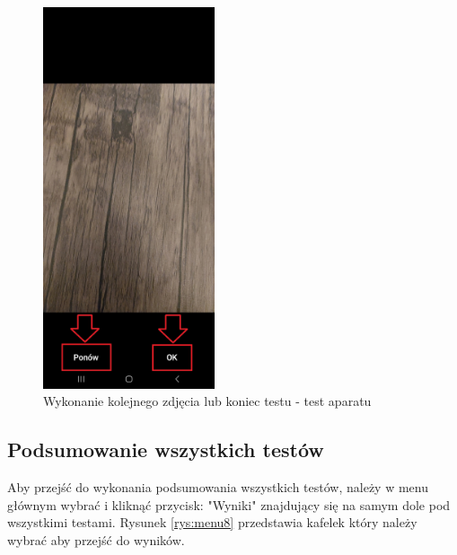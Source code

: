 \begin{figure}[!hbt]
	\begin{center}
		\includegraphics[angle=360, width=0.45\textwidth]{rys/punkt6/aparat2}
		\caption{Wykonanie kolejnego zdjęcia lub koniec testu - test aparatu}
		\label{rys:aparat2}
	\end{center}
\end{figure}

\newpage


\subsection{Podsumowanie wszystkich testów}

\hspace{0.60cm}Aby przejść do wykonania podsumowania wszystkich testów, należy w menu głównym wybrać i kliknąć przycisk: "Wyniki" znajdujący się na samym dole pod wszystkimi testami. Rysunek \ref{rys:menu8} przedstawia kafelek który należy wybrać aby przejść do wyników.

